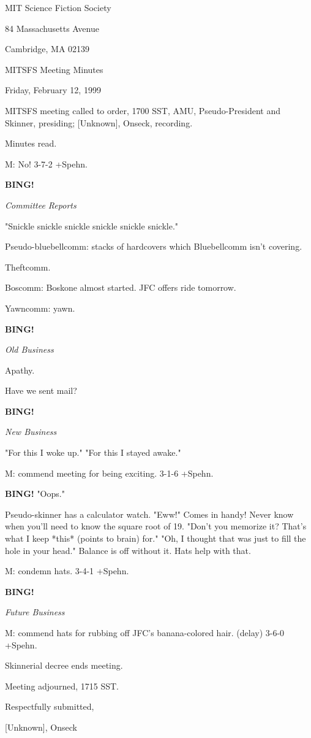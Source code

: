 \documentclass[12pt]{article}
\newcommand{\bing}{{\bf BING!} }
\newcommand{\goto}[1]{\bing \vskip 12pt \centerline{{\em{#1}}}}
\begin{document}
\begin{center}

MIT Science Fiction Society 

84 Massachusetts Avenue

Cambridge, MA 02139

\vspace{12pt}

MITSFS Meeting Minutes 

Friday, February 12, 1999

\end{center}
 
\vspace{18pt}

\setlength{\parskip}{6pt}

\noindent
MITSFS meeting called to order, 1700 SST,
AMU, Pseudo-President and Skinner, presiding; [Unknown], Onseck, recording.

Minutes read.

M: No! 3-7-2 +Spehn.

\goto{Committee Reports}

"Snickle snickle snickle snickle snickle snickle."

Pseudo-bluebellcomm: stacks of hardcovers which Bluebellcomm isn't covering.

Theftcomm.

Boscomm: Boskone almost started. JFC offers ride tomorrow.

Yawncomm: yawn.

\goto{Old Business}

Apathy.

Have we sent mail?

\goto{New Business}

"For this I woke up." "For this I stayed awake."

M: commend meeting for being exciting. 3-1-6 +Spehn.

\bing "Oops."

Pseudo-skinner has a calculator watch. "Eww!" Comes in handy! Never know when you'll need to know the square root of 19. "Don't you memorize it? That's what I keep *this* (points to brain) for." "Oh, I thought that was just to fill the hole in your head." Balance is off without it. Hats help with that.

M: condemn hats. 3-4-1 +Spehn.

\goto{Future Business}

M: commend hats for rubbing off JFC's banana-colored hair. (delay) 3-6-0 +Spehn.

Skinnerial decree ends meeting.

\vspace{12pt}

\noindent
Meeting adjourned, 1715 SST.

\vspace{18pt}

\centerline{Respectfully submitted,}
\centerline{[Unknown], Onseck}
\end{document}
